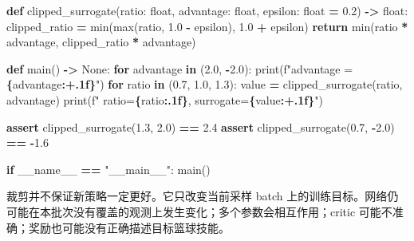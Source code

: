 \documentclass[
  chinese,
  11pt,
  letterpaper,
]{article}
\newenvironment{Shaded}{\begin{snugshade}}{\end{snugshade}}
\newcommand{\BuiltInTok}[1]{#1}
\newcommand{\ControlFlowTok}[1]{\textcolor[rgb]{0.13,0.29,0.53}{\textbf{#1}}}
\newcommand{\FloatTok}[1]{\textcolor[rgb]{0.00,0.00,0.81}{#1}}
\newcommand{\KeywordTok}[1]{\textcolor[rgb]{0.13,0.29,0.53}{\textbf{#1}}}
\newcommand{\NormalTok}[1]{#1}
\newcommand{\OperatorTok}[1]{\textcolor[rgb]{0.81,0.36,0.00}{\textbf{#1}}}
\newcommand{\SpecialCharTok}[1]{\textcolor[rgb]{0.81,0.36,0.00}{\textbf{#1}}}
\newcommand{\SpecialStringTok}[1]{\textcolor[rgb]{0.31,0.60,0.02}{#1}}
\newcommand{\StringTok}[1]{\textcolor[rgb]{0.31,0.60,0.02}{#1}}
\newcommand{\VariableTok}[1]{\textcolor[rgb]{0.00,0.00,0.00}{#1}}
\renewenvironment{Shaded}{\par\smallskip}{\par\smallskip}
\begin{document}
\begin{Shaded}
\begin{Highlighting}[]
\KeywordTok{def}\NormalTok{ clipped\_surrogate(ratio: }\BuiltInTok{float}\NormalTok{, advantage: }\BuiltInTok{float}\NormalTok{, epsilon: }\BuiltInTok{float} \OperatorTok{=} \FloatTok{0.2}\NormalTok{) }\OperatorTok{{-}\textgreater{}} \BuiltInTok{float}\NormalTok{:}
\NormalTok{    clipped\_ratio }\OperatorTok{=} \BuiltInTok{min}\NormalTok{(}\BuiltInTok{max}\NormalTok{(ratio, }\FloatTok{1.0} \OperatorTok{{-}}\NormalTok{ epsilon), }\FloatTok{1.0} \OperatorTok{+}\NormalTok{ epsilon)}
    \ControlFlowTok{return} \BuiltInTok{min}\NormalTok{(ratio }\OperatorTok{*}\NormalTok{ advantage, clipped\_ratio }\OperatorTok{*}\NormalTok{ advantage)}


\KeywordTok{def}\NormalTok{ main() }\OperatorTok{{-}\textgreater{}} \VariableTok{None}\NormalTok{:}
    \ControlFlowTok{for}\NormalTok{ advantage }\KeywordTok{in}\NormalTok{ (}\FloatTok{2.0}\NormalTok{, }\OperatorTok{{-}}\FloatTok{2.0}\NormalTok{):}
        \BuiltInTok{print}\NormalTok{(}\SpecialStringTok{f"advantage = }\SpecialCharTok{\{}\NormalTok{advantage}\SpecialCharTok{:+.1f\}}\SpecialStringTok{"}\NormalTok{)}
        \ControlFlowTok{for}\NormalTok{ ratio }\KeywordTok{in}\NormalTok{ (}\FloatTok{0.7}\NormalTok{, }\FloatTok{1.0}\NormalTok{, }\FloatTok{1.3}\NormalTok{):}
\NormalTok{            value }\OperatorTok{=}\NormalTok{ clipped\_surrogate(ratio, advantage)}
            \BuiltInTok{print}\NormalTok{(}\SpecialStringTok{f"  ratio=}\SpecialCharTok{\{}\NormalTok{ratio}\SpecialCharTok{:.1f\}}\SpecialStringTok{, surrogate=}\SpecialCharTok{\{}\NormalTok{value}\SpecialCharTok{:+.1f\}}\SpecialStringTok{"}\NormalTok{)}

    \ControlFlowTok{assert}\NormalTok{ clipped\_surrogate(}\FloatTok{1.3}\NormalTok{, }\FloatTok{2.0}\NormalTok{) }\OperatorTok{==} \FloatTok{2.4}
    \ControlFlowTok{assert}\NormalTok{ clipped\_surrogate(}\FloatTok{0.7}\NormalTok{, }\OperatorTok{{-}}\FloatTok{2.0}\NormalTok{) }\OperatorTok{==} \OperatorTok{{-}}\FloatTok{1.6}


\ControlFlowTok{if} \VariableTok{\_\_name\_\_} \OperatorTok{==} \StringTok{"\_\_main\_\_"}\NormalTok{:}
\NormalTok{    main()}
\end{Highlighting}
\end{Shaded}

裁剪并不保证新策略一定更好。它只改变当前采样 batch
上的训练目标。网络仍可能在本批次没有覆盖的观测上发生变化；多个参数会相互作用；critic
可能不准确；奖励也可能没有正确描述目标篮球技能。
\end{document}
